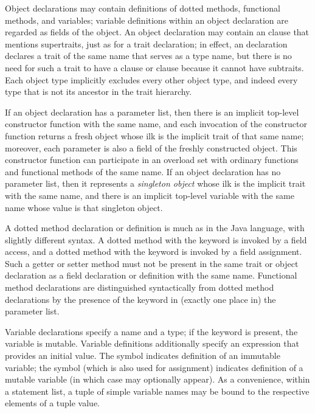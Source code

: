 Object declarations may contain definitions of dotted methods, functional methods, and variables;
variable definitions within an object declaration are regarded as fields of the object.
An object declaration may contain an  clause that mentions supertraits,
just as for a trait declaration; in effect, an  declaration declares a trait of
the same name that serves as a type name, but there is no need for such a trait
to have a  clause or  clause because it cannot have subtraits.
Each object type implicitly excludes every other object type,
and indeed every type that is not its ancestor in the trait hierarchy.

If an object declaration has a parameter list, then there is an implicit top-level constructor
function with the same name, and each invocation of the constructor function returns
a fresh object whose ilk is the implicit trait of that same name; moreover, each parameter
is also a field of the freshly constructed object.
This constructor function can participate in an overload set with ordinary functions and
functional methods of the same name.
If an object declaration has no
parameter list, then it represents a \emph{singleton object} whose ilk is the implicit trait
with the same name, and there is an implicit top-level variable with the same name whose value
is that singleton object.

A dotted method declaration or definition is much as in the Java language, with slightly different syntax.
A dotted method with the  keyword is invoked by a field access,
and a dotted method with the  keyword is invoked by a field assignment.
Such a getter or setter method must not be present in the same trait or
object declaration as a field declaration or definition with the same name.
Functional method declarations are distinguished syntactically from dotted method
declarations by the presence of the keyword  in (exactly one place in) the parameter list.

Variable declarations specify a name and a type; if the keyword  is present,
the variable is mutable.  Variable definitions additionally
specify an expression that provides an initial value.  The symbol \EXP{=} indicates
definition of an immutable variable; the symbol \EXP{\ASSIGN} (which is also used for assignment) indicates
definition of a mutable variable (in which case  may optionally appear).
As a convenience, within a statement list, a tuple of simple variable names may be bound to the
respective elements of a tuple value.

